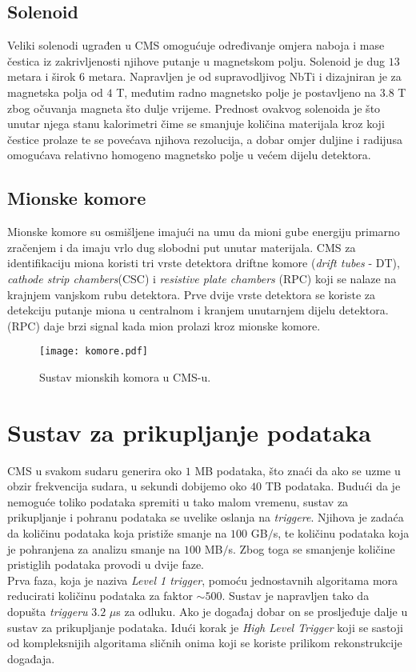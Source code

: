 \documentclass[a4paper,12pt]{report}
\begin{document}
\subsection{Solenoid}
\label{solenoid}
Veliki solenodi ugrađen u CMS omogućuje određivanje omjera naboja i mase  čestica iz zakrivljenosti njihove putanje u magnetskom polju. Solenoid je dug $13$ metara i širok $6$ metara. Napravljen je od supravodljivog NbTi i dizajniran je za magnetska polja od $4$ T, međutim radno magnetsko polje je postavljeno na $3.8$ T zbog očuvanja magneta što dulje vrijeme. Prednost ovakvog solenoida je što unutar njega stanu kalorimetri čime se smanjuje količina materijala kroz koji čestice prolaze te se povećava njihova rezolucija, a dobar omjer duljine i radijusa omogućava relativno homogeno magnetsko polje u većem dijelu detektora.


\subsection{Mionske komore}
\label{mioni}
Mionske komore su osmišljene imajući na umu da mioni gube energiju primarno zračenjem i da imaju vrlo dug slobodni put unutar materijala.
CMS za identifikaciju miona koristi tri vrste detektora driftne komore (\textit{drift tubes} - DT), \textit{cathode strip chambers}(CSC) i \textit{resistive plate chambers} (RPC) koji se nalaze na krajnjem vanjskom rubu detektora. Prve dvije vrste detektora se koriste za detekciju putanje miona u centralnom i kranjem unutarnjem dijelu detektora. (RPC) daje brzi signal kada mion prolazi kroz mionske komore.
\begin{figure}%
\centering
\texttt{[image: komore.pdf]}%
\caption{Sustav mionskih komora u CMS-u. \cite{technical}}%
\label{fig:komore}%
\end{figure}

\section{Sustav za prikupljanje podataka}

CMS u svakom sudaru generira oko $1$ MB podataka, što znaći da ako se uzme u obzir frekvencija sudara, u sekundi dobijemo oko $40$ TB podataka. Budući da je nemoguće toliko podataka spremiti u tako malom vremenu, sustav za prikupljanje i pohranu podataka se uvelike oslanja na \textit{triggere}. Njihova je zadaća da količinu podataka koja pristiže smanje na $100$ GB$/$s, te količinu podataka koja je pohranjena za analizu smanje na $100$ MB$/$s. Zbog toga se smanjenje količine pristiglih podataka provodi u dvije faze.\\
Prva faza, koja je naziva \textit{Level 1 trigger}, pomoću jednostavnih algoritama mora reducirati količinu podataka za faktor $\sim 500$. Sustav je napravljen tako da dopušta \textit{triggeru} $3.2$ $\mu$s za odluku. Ako je događaj dobar on se prosljeđuje dalje u sustav za prikupljanje podataka. Idući korak je \textit{High Level Trigger} koji se sastoji od kompleksnijih algoritama sličnih onima koji se koriste prilikom rekonstrukcije događaja.
\end{document}
